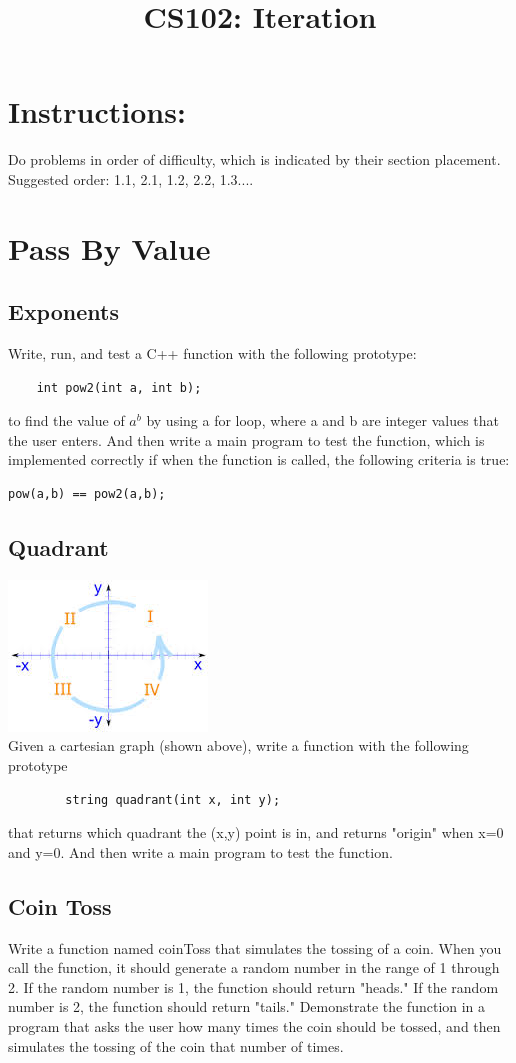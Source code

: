 \documentclass{article}
\begin{document}
\title{CS102: Iteration}

\maketitle
\section*{Instructions:}
Do problems in order of difficulty, which is indicated by their section placement. Suggested order: 1.1, 2.1, 1.2, 2.2, 1.3....
\section{Pass By Value}

\subsection{Exponents}
Write, run, and test a C++ function with the following prototype:
\begin{verbatim}
	int pow2(int a, int b);
\end{verbatim}
to find the value of $a^{b}$  by using a for loop, where a and b are integer values that the user enters. And then write a main program to test the function, which is implemented correctly if when the function is called, the following criteria is true:
\begin{verbatim}
pow(a,b) == pow2(a,b);
\end{verbatim}

\subsection{Quadrant}
\includegraphics[width=.25\textwidth]{images}\\
Given a cartesian graph (shown above), write a function with the following prototype 
\begin{verbatim}
        string quadrant(int x, int y);
\end{verbatim}
that returns which quadrant the (x,y) point is in, and returns "origin" when x=0 and y=0. And then write a main program to test the function.

\subsection{Coin Toss}
Write a function named coinToss that simulates the tossing of a coin. When you call the function, it should generate a random number in the range of 1 through 2. If the random number is 1, the function should return "heads." If the random number is 2, the function should return "tails." Demonstrate the function in a program that asks the user how many times  the coin should be tossed, and then simulates the tossing of the coin that number of times. 
\end{document}
